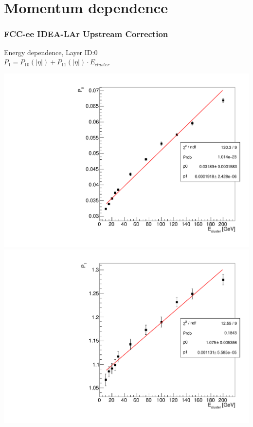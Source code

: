 \documentclass{beamer}
\newcommand{\redtext}[1]{%
  \textcolor{myRed}{#1}
}
\begin{document}
\section{Momentum dependence}
\begin{frame}
  \frametitle{FCC-ee IDEA-LAr Upstream Correction}

  \begin{center}
    Energy dependence, Layer \redtext{ID:\@ 0} \\
    $P_1 = P_{10}(|\eta|) + P_{11}(|\eta|) \cdot E_{cluster}$
  \end{center}

  \includegraphics[width=0.49\linewidth]{figures/momentum_id0/graph_upstream_corr_param0.pdf}
  \includegraphics[width=0.49\linewidth]{figures/momentum_id0/graph_upstream_corr_param1.pdf}
\end{frame}
\end{document}
